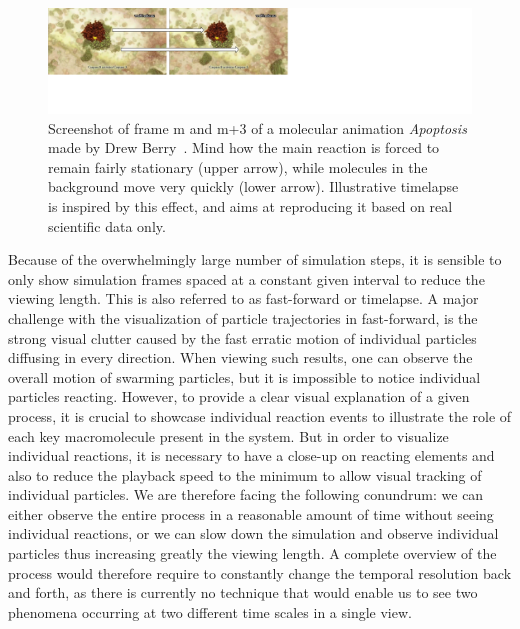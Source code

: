 \begin{figure}
	\centering
	\includegraphics[width=0.9\linewidth]{graphics/Apoptosis}
	\caption{Screenshot of frame m and m+3 of a molecular animation \textit{Apoptosis} made by Drew Berry~\cite{Apoptosis}. Mind how the main reaction is forced to remain fairly stationary
		(upper arrow), while molecules in the background move very quickly (lower arrow). Illustrative timelapse is inspired by this effect, and aims at reproducing it based on real scientific data only.}
	\label{fig:apoptosis}
\end{figure}

Because of the overwhelmingly large number of simulation steps, it is sensible to only show simulation frames spaced at a constant given interval to reduce the viewing length. This is also referred to as fast-forward or timelapse.
A major challenge with the visualization of particle trajectories in fast-forward, is the strong visual clutter caused by the fast erratic motion of individual particles diffusing in every direction.
When viewing such results, one can observe the overall motion of swarming particles, but it is impossible to notice individual particles reacting.
However, to provide a clear visual explanation of a given process, it is crucial to showcase individual reaction events to illustrate the role of each key macromolecule present in the system.
But in order to visualize individual reactions, it is necessary to have a close-up on reacting elements and also to reduce the playback speed to the minimum to allow visual tracking of individual particles.
We are therefore facing the following conundrum: we can either observe the entire process in a reasonable amount of time without seeing individual reactions, or we can slow down the simulation and observe individual particles thus increasing greatly the viewing length.
A complete overview of the process would therefore require to constantly change the temporal resolution back and forth, as there is currently no technique that would enable us to see two phenomena occurring at two different time scales in a single view.

